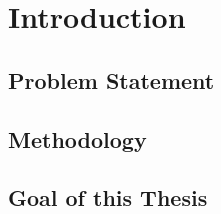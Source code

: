 
\chapter{Introduction}
\label{ch:Introduction}

\section{Problem Statement}

\section{Methodology}

\section{Goal of this Thesis}
